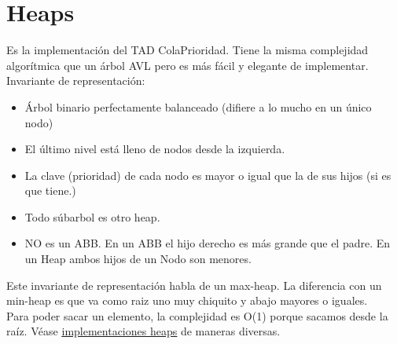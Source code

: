 \documentclass[10pt,a4paper]{article}
\begin{document}
\section*{Heaps}
Es la implementación del TAD ColaPrioridad. Tiene la misma complejidad algorítmica que un árbol AVL pero es más fácil y elegante de implementar. \\
Invariante de representación:
\begin{itemize}
    \item Árbol binario perfectamente balanceado (difiere a lo mucho en un único nodo)
    \item El último nivel está lleno de nodos desde la izquierda. 
    \item La clave (prioridad) de cada nodo es mayor o igual que la de sus hijos (si es que tiene.)
    \item Todo súbarbol es otro heap. 
    \item NO es un ABB. En un ABB el hijo derecho es más grande que el padre. En un Heap ambos hijos de un Nodo son menores.
\end{itemize}
Este invariante de representación habla de un max-heap. La diferencia con un min-heap es que va como raiz uno muy chiquito y abajo mayores o iguales. \\
Para poder sacar un elemento, la complejidad es O(1) porque sacamos desde la raíz.
Véase \hyperref[subsec:implementaciones_heap]{\underline{implementaciones heaps}} de maneras diversas.
\end{document}
